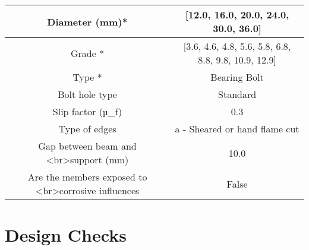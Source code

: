 \documentclass{article}%
\begin{document}
\begin{longtable}{|p{5cm}|p{2cm}|p{2cm}|p{2cm}|p{5cm}|}
\hline%
\multicolumn{3}{|c|}{Diameter (mm)*}&\multicolumn{2}{|c|}{{[}12.0, 16.0, 20.0, 24.0, 30.0, 36.0{]}}\\%
\hline%
\hline%
\multicolumn{3}{|c|}{Grade *}&\multicolumn{2}{|c|}{{[}3.6, 4.6, 4.8, 5.6, 5.8, 6.8, 8.8, 9.8, 10.9, 12.9{]}}\\%
\hline%
\hline%
\multicolumn{3}{|c|}{Type *}&\multicolumn{2}{|c|}{Bearing Bolt}\\%
\hline%
\hline%
\multicolumn{3}{|c|}{Bolt hole type}&\multicolumn{2}{|c|}{Standard}\\%
\hline%
\hline%
\multicolumn{3}{|c|}{Slip factor (µ\_f)}&\multicolumn{2}{|c|}{0.3}\\%
\hline%
\hline%
\multicolumn{3}{|c|}{Type of edges}&\multicolumn{2}{|c|}{a {-} Sheared or hand flame cut}\\%
\hline%
\hline%
\multicolumn{3}{|c|}{Gap between beam and <br>support (mm)}&\multicolumn{2}{|c|}{10.0}\\%
\hline%
\hline%
\multicolumn{3}{|c|}{Are the members exposed to <br>corrosive influences}&\multicolumn{2}{|c|}{False}\\%
\hline%
\end{longtable}

%
%
\newpage%
\section{Design Checks}%
\label{sec:DesignChecks}%
\end{document}
